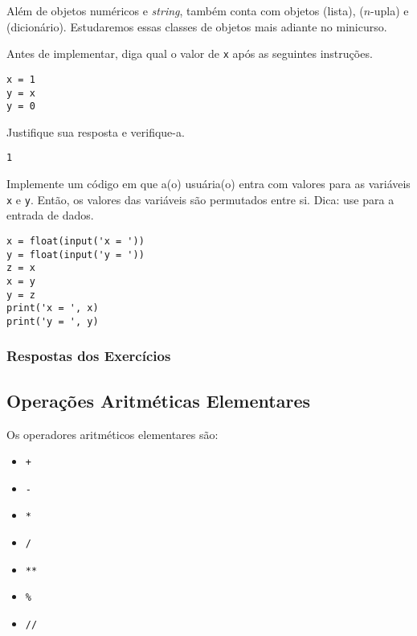 Além de objetos numéricos e {\it string}, {\python} também conta com objetos {\PYTHONlist} (lista), {\PYTHONtuple} ($n$-upla) e {\PYTHONdict} (dicionário). Estudaremos essas classes de objetos mais adiante no minicurso.

\begin{exer}
  Antes de implementar, diga qual o valor de \texttt{x} após as seguintes instruções.

\begin{lstlisting}
x = 1
y = x
y = 0
\end{lstlisting}

Justifique sua resposta e verifique-a.
\end{exer}
\begin{resp}
\texttt{1}
\end{resp}

\begin{exer}
  Implemente um código em que a(o) usuária(o) entra com valores para as variáveis \texttt{x} e \texttt{y}. Então, os valores das variáveis são permutados entre si. Dica: use {\PYTHONinput} para a entrada de dados.
\end{exer}
\begin{resp}

\begin{lstlisting}
x = float(input('x = '))
y = float(input('y = '))
z = x
x = y
y = z
print('x = ', x)
print('y = ', y)
\end{lstlisting}

\end{resp}

\ifisbook 
\subsubsection*{Respostas dos Exercícios}
\shipoutAnswer
\fi

\subsection{Operações Aritméticas Elementares}

Os operadores aritméticos elementares são:
\begin{itemize}
\item[] \texttt{+} 
\item[] \texttt{-} 
\item[] \texttt{*} 
\item[] \texttt{/} 
\item[] \texttt{**} 
\item[] \texttt{\%} 
\item[] \texttt{//} 
\end{itemize}

